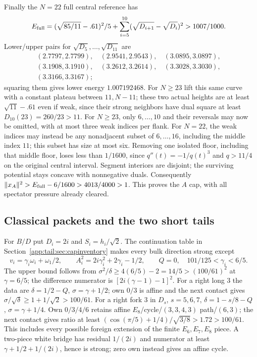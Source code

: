 Finally the $N=22$ full central reference has
\[
 E_{\rm full}=(\sqrt{85/11}-.61)^2/5+
       \sum_{i=5}^{10}(\sqrt{D_{i+1}}-\sqrt{D_i})^2>1007/1000.
\]
Lower/upper pairs for $\sqrt{D_5},\ldots,\sqrt{D_{11}}$ are
\[
\begin{gathered}
(2.7797,2.7799),\quad(2.9541,2.9543),\quad(3.0895,3.0897),\\
(3.1908,3.1910),\quad(3.2612,3.2614),\quad(3.3028,3.3030),\\
(3.3166,3.3167);
\end{gathered}
\]
squaring them gives lower energy $1.007192468$.
For $N\ge23$ lift this same curve with a constant plateau between
$11,N-11$; these two actual heights are at least $\sqrt{11}-.61$
even if weak, since their strong neighbors have dual square at least
$D_{10}(23)=260/23>11$.
For $N\ge23$, only $6,\ldots,10$ and their reversals may now be omitted,
with at most three weak indices per flank. For $N=22$, the weak indices
may instead be any nonadjacent subset of $6,\ldots,16$, including the
middle index $11$; this subset has size at most six.
Removing one isolated floor, including that middle floor, loses
less than $1/1600$, since $q''(t)=-1/q(t)^3$ and $q>11/4$ on
the original central interval. Segment interiors are disjoint;
the surviving potential stays concave with nonnegative duals.
Consequently $\|x_A\|^2>E_{\rm full}-6/1600>4013/4000>1$.
This proves the $A$ cap, with all spectator pressure already cleared.

\subsection{Classical packets and the two short tails}
\label{app:tail:sec:BDcaps}

For $B/D$ put $D_i=2i$ and $S_i=h_i/\sqrt2$.
The continuation table in Section~\ref{app:tail:sec:capinventory} makes every
bulk direction strong except
\begin{equation}\label{app:tail:eq:capclassicalpacket}
 v_i=\gamma_i\omega_i+\omega_1/2,\qquad
 A_i^2=2i\gamma_i^2+2\gamma_i-1/2,\qquad Q=0,
 \quad101/125<\gamma_i<6/5.
\end{equation}
The upper bound follows from
$\sigma^2/\delta\ge4(6/5)-2=14/5>(100/61)^2$ at $\gamma=6/5$;
the difference numerator is $[2i(\gamma-1)-1]^2$.
For a right long $3$ the data are
$\delta=1/2-Q$, $\sigma=\gamma+1/2$; own $0/3$ is affine and
the next contact gives $\sigma/\sqrt\delta\ge1+1/\sqrt2>100/61$.
For a right fork $3$ in $D_s$, $s=5,6,7$,
$\delta=1-s/8-Q$, $\sigma=\gamma+1/4$.
Own $0/3/4/6$ retains affine $E_8$/cycle/$(3,3,4,3)$ path/$(6,3)$;
the next contact gives ratio at least
$(\cos(\pi/5)+1/4)/\sqrt{3/8}>1.72>100/61$.
This includes every possible foreign extension of the finite
$E_6,E_7,E_8$ piece. A two-piece white bridge has residual
$1/(2i)$ and numerator at least $\gamma+1/2+1/(2i)$, hence is
strong; zero own instead gives an affine cycle.

